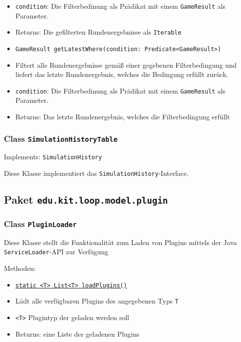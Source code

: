 \documentclass[parskip=full,11pt]{scrartcl}
\begin{document}
\begin{itemize}
	\item[]\texttt{condition}: Die Filterbedinung als Prädikat mit einem \texttt{GameResult} als Parameter.
	\item[]Returns: Die gefilterten Rundenergebnisse als \texttt{Iterable}
	\item \texttt{GameResult getLatestWhere(condition: Predicate<GameResult>)}
	\item[] Filtert alle Rundenergebnisse gemäß einer gegebenen Filterbedingung und liefert das letzte Rundenergebnis, welches die Bedingung erfüllt zurück.
	\item[]\texttt{condition}: Die Filterbedinung als Prädikat mit einem \texttt{GameResult} als Parameter.
	\item[]Returns: Das letzte Rundenergebnis, welches die Filterbedingung erfüllt
\end{itemize}

\subsubsection{Class \texttt{SimulationHistoryTable}}
Implements: \texttt{SimulationHistory}

Diese Klasse implementiert das \texttt{SimulationHistory}-Interface.

\subsection{Paket \texttt{edu.kit.loop.model.plugin}}

\subsubsection{Class \texttt{PluginLoader}}

Diese Klasse stellt die Funktionalität zum Laden von Plugins mittels der Java \texttt{ServiceLoader}-API zur Verfügung

Methoden:

\begin{itemize}\itemsep -10pt
	\item \underline{\texttt{static <T> List<T> loadPlugins()}}
	\item[] Lädt alle verfügbaren Plugins des angegebenen Typs \texttt{T}
	\item[] \texttt{<T>} Plugintyp der geladen werden soll
	\item[]Returns: eine Liste der geladenen Plugins
\end{itemize}
\end{document}
